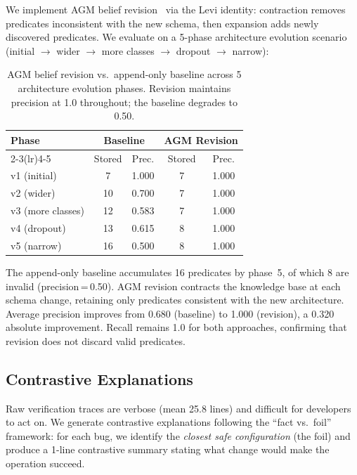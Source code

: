 \documentclass[11pt]{article}
\begin{document}
We implement AGM belief revision~\cite{gardenfors88} via the
Levi identity: contraction removes predicates inconsistent with
the new schema, then expansion adds newly discovered predicates.
We evaluate on a 5-phase architecture evolution scenario
(initial $\to$ wider $\to$ more classes $\to$ dropout $\to$ narrow):

\begin{table}[h]
\centering
\caption{AGM belief revision vs.\ append-only baseline across
  5 architecture evolution phases.  Revision maintains precision
  at 1.0 throughout; the baseline degrades to 0.50.}
\label{tab:agm-revision}
\small
\begin{tabular}{@{}lcccc@{}}
\toprule
\textbf{Phase} & \multicolumn{2}{c}{\textbf{Baseline}} &
\multicolumn{2}{c}{\textbf{AGM Revision}} \\
\cmidrule(lr){2-3}\cmidrule(lr){4-5}
& Stored & Prec. & Stored & Prec. \\
\midrule
v1 (initial)     &  7 & 1.000 &  7 & 1.000 \\
v2 (wider)       & 10 & 0.700 &  7 & 1.000 \\
v3 (more classes)& 12 & 0.583 &  7 & 1.000 \\
v4 (dropout)     & 13 & 0.615 &  8 & 1.000 \\
v5 (narrow)      & 16 & 0.500 &  8 & 1.000 \\
\bottomrule
\end{tabular}
\end{table}

The append-only baseline accumulates 16 predicates by phase~5,
of which 8 are invalid (precision\,=\,0.50).  AGM revision
contracts the knowledge base at each schema change, retaining
only predicates consistent with the new architecture.  Average
precision improves from 0.680 (baseline) to 1.000 (revision),
a 0.320 absolute improvement.  Recall remains 1.0 for both
approaches, confirming that revision does not discard valid predicates.


\subsection{Contrastive Explanations}\label{sec:contrastive-explanations}

Raw verification traces are verbose (mean 25.8 lines) and
difficult for developers to act on.  We generate contrastive
explanations following the ``fact vs.\ foil'' framework: for each
bug, we identify the \emph{closest safe configuration} (the foil)
and produce a 1-line contrastive summary stating what change
would make the operation succeed.
\end{document}
